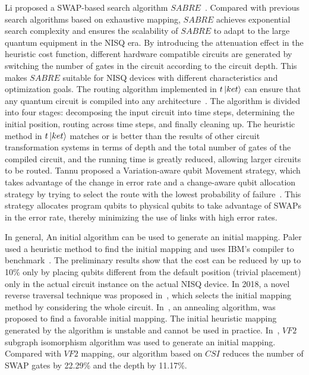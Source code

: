 \documentclass[runningheads]{llncs}
\begin{document}
\begin{enumerate}
	Li proposed a SWAP-based search algorithm $SABRE$~\cite{Li2018}. Compared with previous search algorithms based on exhaustive mapping, $SABRE$ achieves exponential search complexity and ensures the scalability of $SABRE$ to adapt to the large quantum equipment in the NISQ era. By introducing the attenuation effect in the heuristic cost function, different hardware compatible circuits are generated by switching the number of gates in the circuit according to the circuit depth. This makes $SABRE$ suitable for NISQ devices with different characteristics and optimization goals. The routing algorithm implemented in $t\left\vert{ket}\right\rangle$ can ensure that any quantum circuit is compiled into any architecture~\cite{Cowtan2019}. The algorithm is divided into four stages: decomposing the input circuit into time steps, determining the initial position, routing across time steps, and finally cleaning up. The heuristic method in $t\left\vert{ket}\right\rangle$ matches or is better than the results of other circuit transformation systems in terms of depth and the total number of gates of the compiled circuit, and the running time is greatly reduced, allowing larger circuits to be routed. Tannu proposed a Variation-aware qubit Movement strategy, which takes advantage of the change in error rate and a change-aware qubit allocation strategy by trying to select the route with the lowest probability of failure~\cite{Tannu2019}. This strategy allocates program qubits to physical qubits to take advantage of SWAPs in the error rate, thereby minimizing the use of links with high error rates.
\end{enumerate} 
In general, An initial algorithm can be used to generate an initial mapping. Paler used a heuristic method to find the initial mapping and uses IBM's compiler to benchmark~\cite{Paler2018}. The preliminary results show that the cost can be reduced by up to 10\% only by placing qubits different from the default position (trivial placement) only in the actual circuit instance on the actual NISQ device. In 2018, a novel reverse traversal technique was proposed in~\cite{Li2018}, which selects the initial mapping method by considering the whole circuit. In~\cite{Xiangzhen2020}, an annealing algorithm, was proposed to find a favorable initial mapping. The initial heuristic mapping generated by the algorithm is unstable and cannot be used in practice. In~\cite{2020Qubit}, $VF2$ subgraph isomorphism algorithm was used to generate an initial mapping. Compared with $VF2$ mapping, our algorithm based on $CSI$ reduces the number of SWAP gates by 22.29\% and the depth by 11.17\%.
\end{document}
